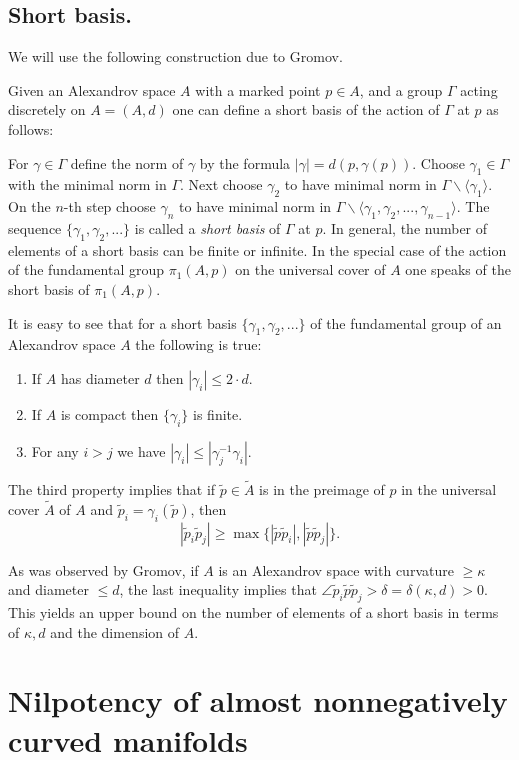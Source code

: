 \documentclass{amsart}
\begin{document}
\subsection{Short basis.}\label{short-basis} We will use the following construction due to Gromov.

Given an Alexandrov space $A$ with a marked point $p\in A$,  and  a group $\Gamma$ acting discretely on $A=(A,d)$ one can define a short basis of the action of $\Gamma$ at $p$ as follows:

For $\gamma\in \Gamma$ define the norm of $\gamma$ by the formula
$|\gamma|= d(p,\gamma(p))$.
Choose $\gamma_1\in \Gamma$
with  the minimal norm in $\Gamma$.
Next choose $\gamma_2$ to have
minimal norm in $\Gamma\backslash \langle\gamma_1\rangle$.
On the $n$-th step choose
$\gamma_n$ to have minimal norm in
$\Gamma\backslash \langle\gamma_1,\gamma_2,...,\gamma_{n-1}\rangle$.
The sequence $\{\gamma_1,\gamma_2,...\}$
is called a {\it short basis} of $\Gamma$ at $p$.
In general, the number of elements of a short basis can be finite or infinite.
In the special case of the action of the fundamental group $\pi_1(A,p)$  on the universal cover of $A$
 one speaks of the short basis of  $\pi_1(A,p)$.

It is easy to see that for a short basis
$\{\gamma_1,\gamma_2,...\}$ of the fundamental group of an Alexandrov space $A$
the following is true:
\begin{enumerate}
\item If $A$ has diameter $d$ then $|\gamma_i|\le 2\cdot d$.
\item If $A$ is compact then $\{\gamma_i\}$ is finite.
\item For any $i>j$ we have $|\gamma_i|\le |\gamma_j^{-1}\gamma_i|$.
\end{enumerate}
The third property implies that if
$\tilde p \in \tilde A$
is in the preimage of $p$ in the universal cover $\tilde A$ of $A$
and $\tilde p_i=\gamma_i(\tilde p)$, then
$$|\tilde p_i\tilde p_j|\ge
\max\{|\tilde p\tilde p_i|,|\tilde p\tilde p_j|\}.$$

As was observed by Gromov, if $A$ is an Alexandrov space with curvature $\ge \kappa$ and diameter $\le d$, the last inequality implies that $\angle \tilde p_i \tilde p \tilde p_j>\delta=\delta(\kappa,d)>0$.
This yields an upper bound on the number of elements
of a short basis in terms of $\kappa,d$ and the dimension of $A$.


\section{Nilpotency of almost nonnegatively curved manifolds}\label{sec:nilp}
\end{document}
